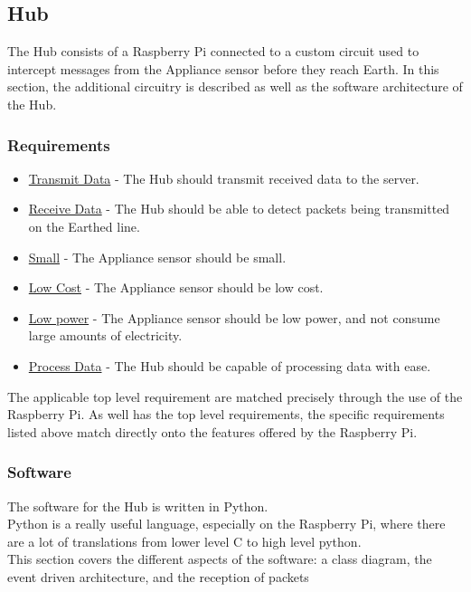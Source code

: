 \documentclass[preprint,12pt,3p]{elsarticle}
\begin{document}
\clearpage
\subsection{Hub}
The Hub consists of a Raspberry Pi connected to a custom circuit used to intercept messages from the Appliance sensor before they reach Earth. In this section, the additional circuitry is described as well as the software architecture of the Hub.
\subsubsection{Requirements}
\begin{itemize}
\item \underline{Transmit Data} - The Hub should transmit received data to the server.
\item \underline{Receive Data} - The Hub should be able to detect packets being transmitted on the Earthed line.
\item \underline{Small} - The Appliance sensor should be small.
\item \underline{Low Cost} - The Appliance sensor should be low cost.
\item \underline{Low power} - The Appliance sensor should be low power, and not consume large amounts of electricity.
\item \underline{Process Data} - The Hub should be capable of processing data with ease.
\end{itemize}
The applicable top level requirement are matched precisely through the use of the Raspberry Pi. As well has the top level requirements, the specific requirements listed above match directly onto the features offered by the Raspberry Pi.

\subsubsection{Software}
The software for the Hub is written in Python.\\
Python is a really useful language, especially on the Raspberry Pi, where there are a lot of translations from lower level C to high level python.\\
This section covers the different aspects of the software: a class diagram, the event driven architecture, and the reception of packets
\end{document}
